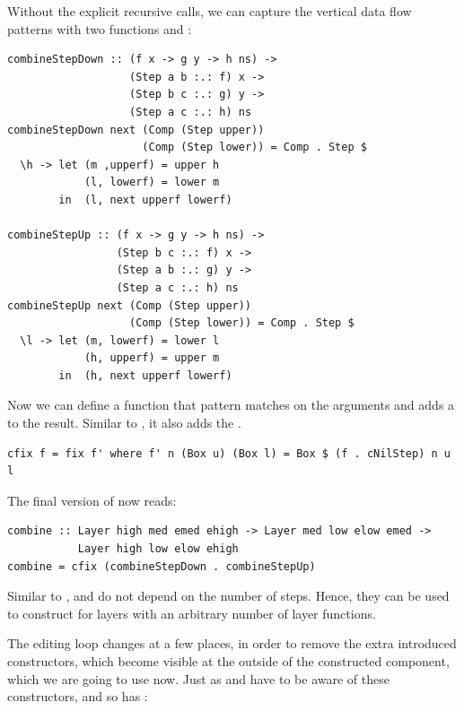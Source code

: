 \documentclass{llncs}
\begin{document}
Without the explicit recursive calls, we can capture the vertical data flow patterns with two functions  and :

\begin{small} 
\begin{verbatim}
combineStepDown :: (f x -> g y -> h ns) -> 
                   (Step a b :.: f) x -> 
                   (Step b c :.: g) y -> 
                   (Step a c :.: h) ns
combineStepDown next (Comp (Step upper)) 
                     (Comp (Step lower)) = Comp . Step $
  \h -> let (m ,upperf) = upper h
            (l, lowerf) = lower m
        in  (l, next upperf lowerf)   

combineStepUp :: (f x -> g y -> h ns) ->
                 (Step b c :.: f) x ->
                 (Step a b :.: g) y ->
                 (Step a c :.: h) ns
combineStepUp next (Comp (Step upper)) 
                   (Comp (Step lower)) = Comp . Step $ 
  \l -> let (m, lowerf) = lower l
            (h, upperf) = upper m
        in  (h, next upperf lowerf)   
\end{verbatim}%
\end{small}

Now we can define a function  that pattern matches on the arguments and adds a  to the result. Similar to , it also adds the .

\begin{small}
\begin{verbatim}
cfix f = fix f' where f' n (Box u) (Box l) = Box $ (f . cNilStep) n u l
\end{verbatim}%
\end{small}

The final version of  now reads:

\begin{small}%
\begin{verbatim}
combine :: Layer high med emed ehigh -> Layer med low elow emed -> 
           Layer high low elow ehigh
combine = cfix (combineStepDown . combineStepUp)
\end{verbatim}
\end{small}


Similar to ,  and  do not depend on the number of steps. Hence, they can be used to construct  for layers with an arbitrary number of layer functions.

\bc
The editing loop changes at a few places, in order to remove the extra introduced constructors, which become visible at the outside of the constructed component, which we are going to use now. Just as  and  have to be aware of these constructors, and so has :
\end{document}
